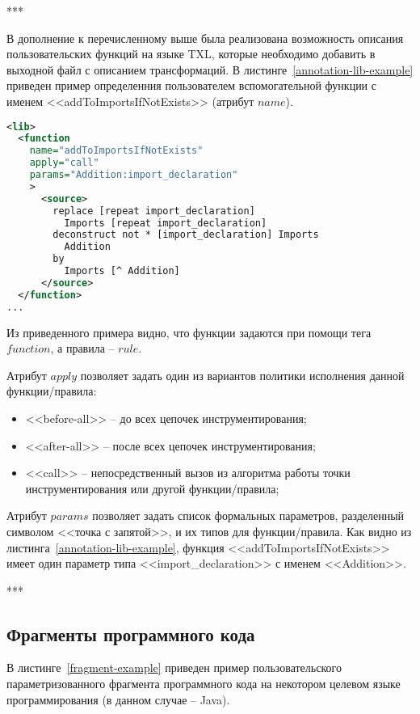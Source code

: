 ***

В дополнение к перечисленному выше была реализована возможность описания пользовательских функций на языке TXL, которые необходимо добавить в выходной файл с описанием трансформаций.
В листинге~\ref{annotation-lib-example} приведен пример определенния пользователем вспомогательной функции с именем <<addToImportsIfNotExists>> (атрибут $name$).

\begin{lstlisting}[frame=single, language=XML, label={annotation-lib-example}, caption={Пример описания вспомогательной функции}]
<lib>
  <function
    name="addToImportsIfNotExists"
    apply="call"
    params="Addition:import_declaration"
    >
      <source>
        replace [repeat import_declaration]
          Imports [repeat import_declaration]
        deconstruct not * [import_declaration] Imports
          Addition
        by
          Imports [^ Addition]
      </source>
  </function>
...
\end{lstlisting}

Из приведенного примера видно, что функции задаются при помощи тега $function$, а правила -- $rule$.

Атрибут $apply$ позволяет задать один из вариантов политики исполнения данной функции/правила:
\begin{itemize}[noitemsep]
  \item <<before-all>>  -- до всех цепочек инструментирования;
  \item <<after-all>>   -- после всех цепочек инструментирования;
  \item <<call>>        -- непосредственный вызов из алгоритма работы точки инструментирования или другой функции/правила;
\end{itemize}

Атрибут $params$ позволяет задать список формальных параметров, разделенный символом <<точка с запятой>>, и их типов для функции/правила.
Как видно из листинга~\ref{annotation-lib-example}, функция <<addToImportsIfNotExists>> имеет один параметр типа <<import\_declaration>> с именем <<Addition>>.

***

\subsection{Фрагменты программного кода}

В листинге~\ref{fragment-example} приведен пример пользовательского параметризованного фрагмента программного кода на некотором целевом языке программирования (в данном случае -- Java).

